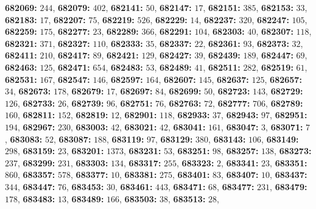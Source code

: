 \textsf{\bfseries 682069:} $244$, \textsf{\bfseries 682079:} $402$, \textsf{\bfseries 682141:} $50$, \textsf{\bfseries 682147:} $17$, \textsf{\bfseries 682151:} $385$, \textsf{\bfseries 682153:} $33$, \textsf{\bfseries 682183:} $17$, \textsf{\bfseries 682207:} $75$, \textsf{\bfseries 682219:} $526$, \textsf{\bfseries 682229:} $14$, \textsf{\bfseries 682237:} $320$, \textsf{\bfseries 682247:} $105$, \textsf{\bfseries 682259:} $175$, \textsf{\bfseries 682277:} $23$, \textsf{\bfseries 682289:} $366$, \textsf{\bfseries 682291:} $104$, \textsf{\bfseries 682303:} $40$, \textsf{\bfseries 682307:} $118$, \textsf{\bfseries 682321:} $371$, \textsf{\bfseries 682327:} $110$, \textsf{\bfseries 682333:} $35$, \textsf{\bfseries 682337:} $22$, \textsf{\bfseries 682361:} $93$, \textsf{\bfseries 682373:} $32$, \textsf{\bfseries 682411:} $210$, \textsf{\bfseries 682417:} $89$, \textsf{\bfseries 682421:} $129$, \textsf{\bfseries 682427:} $39$, \textsf{\bfseries 682439:} $189$, \textsf{\bfseries 682447:} $69$, \textsf{\bfseries 682463:} $125$, \textsf{\bfseries 682471:} $654$, \textsf{\bfseries 682483:} $53$, \textsf{\bfseries 682489:} $41$, \textsf{\bfseries 682511:} $282$, \textsf{\bfseries 682519:} $61$, \textsf{\bfseries 682531:} $167$, \textsf{\bfseries 682547:} $146$, \textsf{\bfseries 682597:} $164$, \textsf{\bfseries 682607:} $145$, \textsf{\bfseries 682637:} $125$, \textsf{\bfseries 682657:} $34$, \textsf{\bfseries 682673:} $178$, \textsf{\bfseries 682679:} $17$, \textsf{\bfseries 682697:} $84$, \textsf{\bfseries 682699:} $50$, \textsf{\bfseries 682723:} $143$, \textsf{\bfseries 682729:} $126$, \textsf{\bfseries 682733:} $26$, \textsf{\bfseries 682739:} $96$, \textsf{\bfseries 682751:} $76$, \textsf{\bfseries 682763:} $72$, \textsf{\bfseries 682777:} $706$, \textsf{\bfseries 682789:} $160$, \textsf{\bfseries 682811:} $152$, \textsf{\bfseries 682819:} $12$, \textsf{\bfseries 682901:} $118$, \textsf{\bfseries 682933:} $37$, \textsf{\bfseries 682943:} $97$, \textsf{\bfseries 682951:} $194$, \textsf{\bfseries 682967:} $230$, \textsf{\bfseries 683003:} $42$, \textsf{\bfseries 683021:} $42$, \textsf{\bfseries 683041:} $161$, \textsf{\bfseries 683047:} $3$, \textsf{\bfseries 683071:} $7$, \textsf{\bfseries 683083:} $52$, \textsf{\bfseries 683087:} $188$, \textsf{\bfseries 683119:} $97$, \textsf{\bfseries 683129:} $380$, \textsf{\bfseries 683143:} $106$, \textsf{\bfseries 683149:} $298$, \textsf{\bfseries 683159:} $23$, \textsf{\bfseries 683201:} $1373$, \textsf{\bfseries 683231:} $53$, \textsf{\bfseries 683251:} $98$, \textsf{\bfseries 683257:} $138$, \textsf{\bfseries 683273:} $237$, \textsf{\bfseries 683299:} $231$, \textsf{\bfseries 683303:} $134$, \textsf{\bfseries 683317:} $255$, \textsf{\bfseries 683323:} $2$, \textsf{\bfseries 683341:} $23$, \textsf{\bfseries 683351:} $860$, \textsf{\bfseries 683357:} $578$, \textsf{\bfseries 683377:} $10$, \textsf{\bfseries 683381:} $275$, \textsf{\bfseries 683401:} $83$, \textsf{\bfseries 683407:} $10$, \textsf{\bfseries 683437:} $344$, \textsf{\bfseries 683447:} $76$, \textsf{\bfseries 683453:} $30$, \textsf{\bfseries 683461:} $443$, \textsf{\bfseries 683471:} $68$, \textsf{\bfseries 683477:} $231$, \textsf{\bfseries 683479:} $178$, \textsf{\bfseries 683483:} $13$, \textsf{\bfseries 683489:} $166$, \textsf{\bfseries 683503:} $38$, \textsf{\bfseries 683513:} $28$, 
